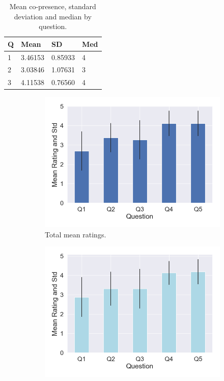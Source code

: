\begin{table}
\begin{tabular}{|llll|}
\hline
Q & Mean & SD & Med \\
\hline
1 &  3.46153 & 0.85933&4\\  
2 &  3.03846 & 1.07631&3\\ 
3 &  4.11538 & 0.76560&4\\ 
\hline
\end{tabular}
\caption{Mean co-presence, standard deviation and median by question.}
\label{tbl:copres}
\end{table}
\clearpage
\begin{figure}[H]
\hspace{-15mm}
\begin{subfigure}[b]{0.5\textwidth}
 \centering
 \includegraphics[scale=0.5]{Files/Plots/presence_mean_ratings.png}
 \caption{Total mean ratings. }
 \label{fig:presAllMean}
 \end{subfigure}
 \hspace{10mm}
\begin{subfigure}[b]{0.5\textwidth}
 \centering
 \includegraphics[scale=0.5]{Files/Plots/presence_mean_ratings_f.png}

\end{subfigure}
\end{figure}
